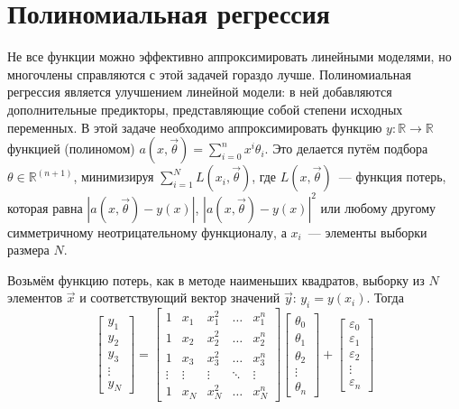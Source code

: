 

\section{Полиномиальная регрессия}

Не все функции можно эффективно аппроксимировать линейными моделями, но многочлены справляются с этой задачей гораздо лучше. Полиномиальная регрессия является улучшением линейной модели: в ней добавляются дополнительные предикторы, представляющие собой степени исходных переменных. В этой задаче необходимо аппроксимировать функцию $y:\mathbb{R} \rightarrow \mathbb{R}$ функцией (полиномом) $a(x, \vec{\theta}) =  \sum\limits_{i=0}^n x^i \theta_{i}$. Это делается путём подбора $\theta\in\mathbb{R}^{(n+1)}$, минимизируя
$\sum\limits_{i=1}^N L(x_i,\vec{\theta})$, где $L(x,\vec{\theta})$~--- функция потерь, которая равна $|a(x,\vec{\theta})-y(x)|$, $|a(x,\vec{\theta})-y(x)|^2$ или любому другому симметричному неотрицательному функционалу, а $x_i$~--- элементы выборки размера $N$.

Возьмём функцию потерь, как в методе наименьших квадратов, выборку из $N$ элементов $\vec{x}$ и соответствующий вектор значений $\vec{y}:\, y_i = y(x_i)$.
Тогда $$\displaystyle {\begin{bmatrix}y_{1}\\y_{2}\\y_{3}\\\vdots \\y_{N}\end{bmatrix}}={\begin{bmatrix}1&x_{1}&x_{1}^{2}&\dots &x_{1}^{n}\\1&x_{2}&x_{2}^{2}&\dots &x_{2}^{n}\\1&x_{3}&x_{3}^{2}&\dots &x_{3}^{n}\\\vdots &\vdots &\vdots &\ddots &\vdots \\1&x_{N}&x_{N}^{2}&\dots &x_{N}^{n}\end{bmatrix}}{\begin{bmatrix}\theta _{0}\\\theta _{1}\\\theta _{2}\\\vdots \\\theta _{n}\end{bmatrix}}+
    \begin{bmatrix}
        \varepsilon _{0} \\\varepsilon _{1}\\\varepsilon _{2}\\\vdots \\\varepsilon _{n}
    \end{bmatrix}$$

